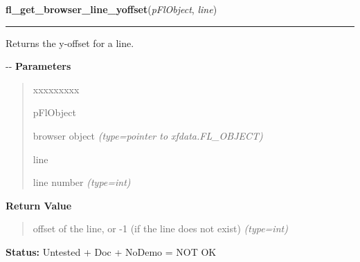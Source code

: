 \hspace{.8\funcindent}\begin{boxedminipage}{\funcwidth}

    \raggedright \textbf{fl\_get\_browser\_line\_yoffset}(\textit{pFlObject}, \textit{line})

    \vspace{-1.5ex}

    \rule{\textwidth}{0.5\fboxrule}
\setlength{\parskip}{2ex}

Returns the y-offset for a line.

-{}-
\setlength{\parskip}{1ex}
      \textbf{Parameters}
      \vspace{-1ex}

      \begin{quote}
        \begin{Ventry}{xxxxxxxxx}

          \item[pFlObject]


browser object
            {\it (type=pointer to xfdata.FL\_OBJECT)}

          \item[line]


line number
            {\it (type=int)}

        \end{Ventry}

      \end{quote}

      \textbf{Return Value}
    \vspace{-1ex}

      \begin{quote}

offset of the line, or -1 (if the line does not exist)
      {\it (type=int)}

      \end{quote}

\textbf{Status:} 
Untested + Doc + NoDemo = NOT OK


    \end{boxedminipage}

    \label{xformslib:flbrowser:fl_get_browser_hscroll_callback}

    \vspace{0.5ex}

